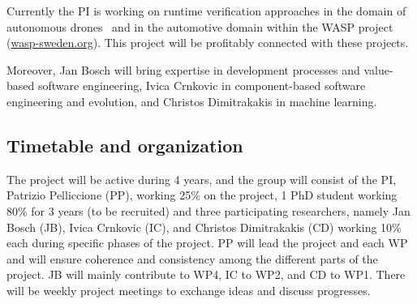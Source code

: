 \documentclass[12pt]{article}
\newcommand{\nb}[2]{
    \fcolorbox{gray}{yellow}{\bfseries\sffamily\scriptsize#1}
    {\sf\small$\blacktriangleright$\textit{#2}$\blacktriangleleft$}
   }
\newcommand{\nb}[2]{}
\newcommand\patrizio[1]{\nb{Patrizio}{#1}}
\begin{document}
Currently the PI is working on runtime verification approaches in the domain of autonomous drones~\cite{ASE2015} and in the automotive domain within the WASP project ({\small \url{wasp-sweden.org}}). This project will be profitably connected with these projects. %

Moreover, Jan Bosch will bring expertise in development processes and value-based software engineering, Ivica Crnkovic in component-based software engineering and evolution, and Christos Dimitrakakis in machine learning. 

\subsection{Timetable and organization}
\vspace{-.2cm}
The \name{} project will be active during 4 years, and the group will consist of the PI, Patrizio Pelliccione (PP), working
25\% on the project, 1 PhD student working 80\%  for 3 years (to be recruited) and three participating researchers, namely Jan Bosch (JB), Ivica Crnkovic (IC), and Christos Dimitrakakis (CD) working 10\% each during specific phases of the project.  PP will lead the project and each WP and will ensure coherence and consistency among the different parts of the project. JB will mainly contribute to WP4, IC to WP2, and CD to WP1. There will be weekly project meetings to exchange ideas and discuss progresses.
\end{document}
